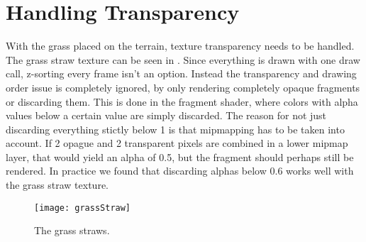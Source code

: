 \section{Handling Transparency}\label{sec:transparency}


With the grass placed on the terrain, texture transparency needs to be
handled. The grass straw texture can be seen in
. Since everything is drawn with one draw
call, z-sorting every frame isn't an option. Instead the transparency
and drawing order issue is completely ignored, by only rendering
completely opaque fragments or discarding them. This is done in the
fragment shader, where colors with alpha values below a certain value
are simply discarded. The reason for not just discarding everything
stictly below 1 is that mipmapping has to be taken into account. If 2
opague and 2 transparent pixels are combined in a lower mipmap layer,
that would yield an alpha of 0.5, but the fragment should perhaps
still be rendered. In practice we found that discarding alphas below
0.6 works well with the grass straw texture.

\begin{figure}
  \label{fig:grassStraws}
  \centering
  \texttt{[image: grassStraw]}
  \caption{The grass straws.}
\end{figure}


